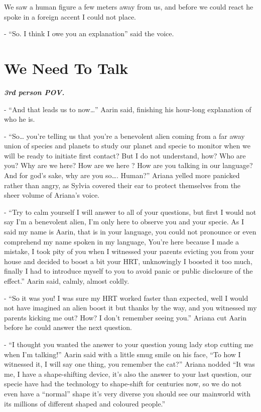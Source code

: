 \documentclass[colorlinks,12pt,a4paper]{book}
\begin{document}
We saw a human figure a few meters away from us, and before we could react he spoke in a foreign accent I could not place.\par
\bigskip

- “So. I think I owe you an explanation” said the voice.
\chapter{We Need To Talk}
\textit{\textbf{3rd person POV.}}\par
\bigskip

- “And that leads us to now…” Aarin said, finishing his hour-long explanation of who he is.\par
\bigskip

- “So… you're telling us that you're a benevolent alien coming from a far 
away union of species and planets to study our planet and specie to monitor when we will be 
ready to initiate first contact? But I do not understand, how? Who are you? Why are we here? 
How are we here ? How are you talking in our language? And for god's sake, why are you so…. Human?” 
Ariana yelled more panicked rather than angry, as Sylvia covered their ear to protect themselves 
from the sheer volume of Ariana's voice.\par
\bigskip

- “Try to calm yourself I will answer to all of your questions, 
but first I would not say I'm a benevolent alien, I'm only here to 
observe you and your specie. As I said my name is Aarin, that is in your language, 
you could not pronounce or even comprehend my name spoken in my language, You're here because I made a mistake,
 I took pity of you when I witnessed your parents evicting you from your 
 house and decided to boost a bit your HRT, unknowingly I boosted it too much, finally I had to 
 introduce myself to you to avoid panic or public disclosure of the effect.” Aarin said, calmly, almost coldly.\par
 \bigskip

- “So it was you! I was sure my HRT worked faster than expected, well I would not have imagined an alien boost it 
but thanks by the way, and you witnessed my parents kicking me out? How? I don't remember seeing you.”
 Ariana cut Aarin before he could answer the next question.\par
 \bigskip

- “I thought you wanted the answer to your question young lady stop cutting me when I'm talking!” 
Aarin said with a little smug smile on his face, “To how I witnessed it, I will say one thing, you remember the cat?” 
Ariana nodded “It was me, I have a shape-shifting device, it's also the answer to your last question, 
our specie have had the technology to shape-shift for centuries now, so we do not even have a “normal” shape it's 
very diverse you should see our mainworld with its millions of different shaped and coloured people.”\par
\bigskip
\end{document}
